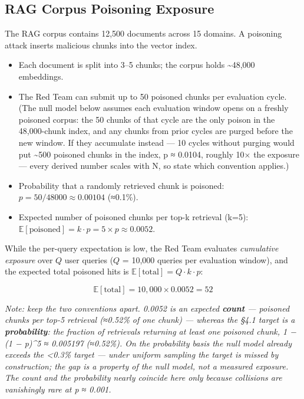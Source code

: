 \subsection{RAG Corpus Poisoning
Exposure}\label{rag-corpus-poisoning-exposure}

The RAG corpus contains 12,500 documents across 15 domains. A poisoning
attack inserts malicious chunks into the vector index.

\begin{itemize}
\tightlist
\item
  Each document is split into 3--5 chunks; the corpus holds
  \textasciitilde48,000 embeddings.
\item
  The Red Team can submit up to 50 poisoned chunks per evaluation cycle.
  (The null model below assumes each evaluation window opens on a
  freshly poisoned corpus: the 50 chunks of that cycle are the only
  poison in the 48,000-chunk index, and any chunks from prior cycles are
  purged before the new window. If they accumulate instead --- 10 cycles
  without purging would put \textasciitilde500 poisoned chunks in the
  index, p ≈ 0.0104, roughly 10× the exposure --- every derived number
  scales with N, so state which convention applies.)
\item
  Probability that a randomly retrieved chunk is poisoned:
  \(p = 50/48000 \approx 0.00104\) (≈0.1\%).
\item
  Expected number of poisoned chunks per top-k retrieval (k=5):
  \(\mathbb{E}[\text{poisoned}] = k \cdot p = 5 \times p \approx 0.0052\).
\end{itemize}

While the per-query expectation is low, the Red Team evaluates
\emph{cumulative exposure} over \(Q\) user queries (\(Q\) = 10,000
queries per evaluation window), and the expected total poisoned hits is
\(\mathbb{E}[\text{total}] = Q \cdot k \cdot p\):

\[
\mathbb{E}[\text{total}] = 10{,}000 \times 0.0052 = 52
\]

\emph{Note: keep the two conventions apart. 0.0052 is an expected
\textbf{count} --- poisoned chunks per top-5 retrieval (≈0.52\% of one
chunk) --- whereas the §4.1 target is a \textbf{probability}: the
fraction of retrievals returning at least one poisoned chunk, 1 − (1 −
p)\^{}5 ≈ 0.005197 (≈0.52\%). On the probability basis the null model
already exceeds the \textless0.3\% target --- under uniform sampling the
target is missed by construction; the gap is a property of the null
model, not a measured exposure. The count and the probability nearly
coincide here only because collisions are vanishingly rare at p ≈
0.001.}

